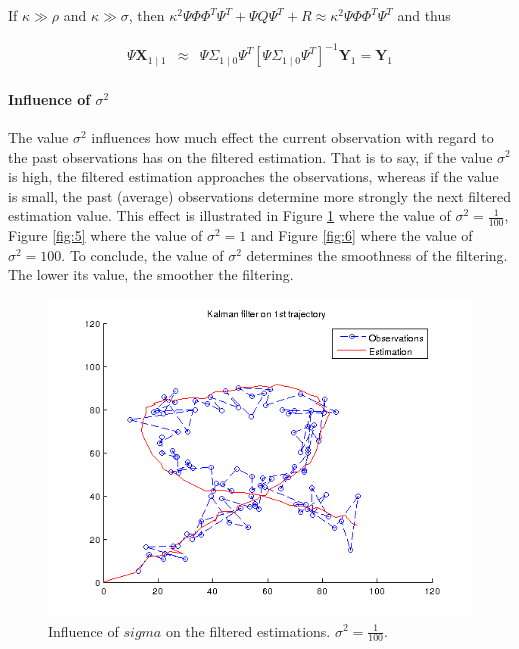 \documentclass[a4paper, 12pt, titlepage]{article}
\begin{document}
If $\kappa \gg \rho$ and $\kappa \gg \sigma$, then $\kappa^2 \Psi \Phi \Phi^T \Psi^T + \Psi Q \Psi^T + R \approx \kappa^2 \Psi \Phi \Phi^T \Psi^T$ and thus

\begin{eqnarray}
	\Psi\pmb{X}_{1\mid 1} &\approx& \Psi \Sigma_{1\mid 0} \Psi^T \left[ \Psi\Sigma_{1\mid 0} \Psi^T \right]^{-1}\pmb{Y}_1 = \pmb{Y}_1 
\end{eqnarray}

\paragraph{Influence of $\sigma^2$}

The value $\sigma^2$ influences how much effect the current observation with regard to the past observations has on the filtered estimation. 
That is to say, if the value $\sigma^2$ is high, the filtered estimation approaches the observations, whereas if the value is small, the past (average) observations determine more strongly the next filtered estimation value. 
This effect is illustrated in Figure \ref{fig:4} where the value of $\sigma^2=\frac{1}{100}$, Figure \ref{fig:5} where the value of $\sigma^2=1$ and Figure \ref{fig:6} where the value of $\sigma^2=100$. 
To conclude, the value of $\sigma^2$ determines the smoothness of the filtering. 
The lower its value, the smoother the filtering.

\begin{figure}
	\includegraphics[width=15cm]{images/sigma01.png}
	\caption{Influence of $sigma$ on the filtered estimations. $\sigma^2=\frac{1}{100}$.}
	\label{fig:4}
\end{figure}
\end{document}
